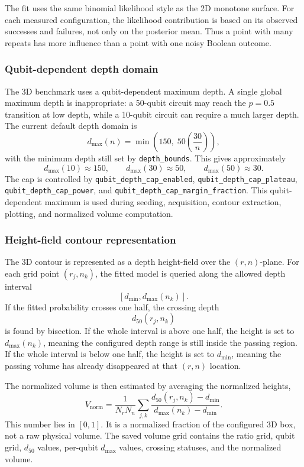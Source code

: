 The fit uses the same binomial likelihood style as the 2D monotone surface.
For each measured configuration, the likelihood contribution is based on its
observed successes and failures, not only on the posterior mean.  Thus a point
with many repeats has more influence than a point with one noisy Boolean
outcome.

\subsubsection{Qubit-dependent depth domain}

The 3D benchmark uses a qubit-dependent maximum depth.  A single global maximum
depth is inappropriate: a 50-qubit circuit may reach the \(p=0.5\) transition
at low depth, while a 10-qubit circuit can require a much larger depth.  The
current default depth domain is
\[
    d_{\max}(n)
    =
    \min\!\left(
        150,\;
        50\left(\frac{30}{n}\right)
    \right),
\]
with the minimum depth still set by \texttt{depth\_bounds}.  This gives
approximately
\[
    d_{\max}(10)\approx 150,\qquad
    d_{\max}(30)\approx 50,\qquad
    d_{\max}(50)\approx 30.
\]
The cap is controlled by \texttt{qubit\_depth\_cap\_enabled},
\texttt{qubit\_depth\_cap\_plateau},
\texttt{qubit\_depth\_cap\_power}, and
\texttt{qubit\_depth\_cap\_margin\_fraction}.  This qubit-dependent maximum is
used during seeding, acquisition, contour extraction, plotting, and normalized
volume computation.

\subsubsection{Height-field contour representation}

The 3D contour is represented as a depth height-field over the
\((r,n)\)-plane.  For each grid point \((r_j,n_k)\), the fitted model is queried
along the allowed depth interval
\[
    [d_{\min}, d_{\max}(n_k)].
\]
If the fitted probability crosses one half, the crossing depth
\[
    d_{50}(r_j,n_k)
\]
is found by bisection.  If the whole interval is above one half, the height is
set to \(d_{\max}(n_k)\), meaning the configured depth range is still inside the
passing region.  If the whole interval is below one half, the height is set to
\(d_{\min}\), meaning the passing volume has already disappeared at that
\((r,n)\) location.

The normalized volume is then estimated by averaging the normalized heights,
\[
    V_{\mathrm{norm}}
    =
    \frac{1}{N_rN_n}
    \sum_{j,k}
    \frac{
        d_{50}(r_j,n_k)-d_{\min}
    }{
        d_{\max}(n_k)-d_{\min}
    }.
\]
This number lies in \([0,1]\).  It is a normalized fraction of the configured
3D box, not a raw physical volume.  The saved volume grid contains the ratio
grid, qubit grid, \(d_{50}\) values, per-qubit \(d_{\max}\) values, crossing
statuses, and the normalized volume.

